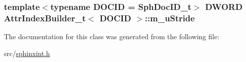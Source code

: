 \hypertarget{classAttrIndexBuilder__t_a8018fbae14ab733b2ad584a09ab5881c}{
\subsubsection[{m\-\_\-u\-Stride}]{\setlength{\rightskip}{0pt plus 5cm}template$<$typename D\-O\-C\-I\-D  = Sph\-Doc\-I\-D\-\_\-t$>$ {\bf D\-W\-O\-R\-D} {\bf Attr\-Index\-Builder\-\_\-t}$<$ D\-O\-C\-I\-D $>$\-::m\-\_\-u\-Stride\hspace{0.3cm}{\ttfamily [private]}}}\label{classAttrIndexBuilder__t_a8018fbae14ab733b2ad584a09ab5881c}


The documentation for this class was generated from the following file\-:\begin{DoxyCompactItemize}
\item 
src/\hyperlink{sphinxint_8h}{sphinxint.\-h}\end{DoxyCompactItemize}
